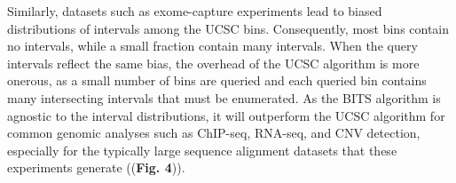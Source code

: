\documentclass{bioinfo}
\begin{document}
        
        Similarly, datasets such as exome-capture experiments lead to biased distributions of intervals among the UCSC bins.
        Consequently, most bins contain no intervals, while a small fraction contain many intervals. When the query intervals
        reflect the same bias, the overhead of the UCSC algorithm is more onerous, as a small number of bins are queried 
        and each queried bin contains many intersecting intervals that must be enumerated. As the BITS algorithm
        is agnostic to the interval distributions, it will outperform the UCSC algorithm for common genomic analyses such
        as ChIP-seq, RNA-seq, and CNV detection, especially for the typically large sequence alignment datasets
        that these experiments generate ((\textbf{Fig. 4})).
        
        
        
        
\end{document}
